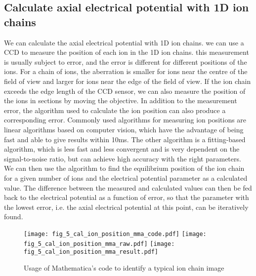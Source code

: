 \subsection{Calculate axial electrical potential with 1D ion chains}

We can calculate the axial electrical potential with 1D ion chains. we can use a CCD to measure the position of each ion in the 1D ion chains. this measurement is usually subject to error, and the error is different for different positions of the ions. For a chain of ions, the aberration is smaller for ions near the centre of the field of view and larger for ions near the edge of the field of view. If the ion chain exceeds the edge length of the CCD sensor, we can also measure the position of the ions in sections by moving the objective. In addition to the measurement error, the algorithm used to calculate the ion position can also produce a corresponding error. Commonly used algorithms for measuring ion positions are linear algorithms based on computer vision, which have the advantage of being fast and able to give results within 10ms. The other algorithm is a fitting-based algorithm, which is less fast and less convergent and is very dependent on the signal-to-noise ratio, but can achieve high accuracy with the right parameters. We can then use the algorithm to find the equilibrium position of the ion chain for a given number of ions and the electrical potential parameter as a calculated value. The difference between the measured and calculated values can then be fed back to the electrical potential as a function of error, so that the parameter with the lowest error, i.e. the axial electrical potential at this point, can be iteratively found.

\begin{figure}
    \centering
    {\texttt{[image: fig\_5\_cal\_ion\_position\_mma\_code.pdf]}}
    {\texttt{[image: fig\_5\_cal\_ion\_position\_mma\_raw.pdf]}}
    {\texttt{[image: fig\_5\_cal\_ion\_position\_mma\_result.pdf]}}
    \caption{Usage of Mathematica's code to identify a typical ion chain image}
    \label{fig:cal_ion_position_mma}
\end{figure}

